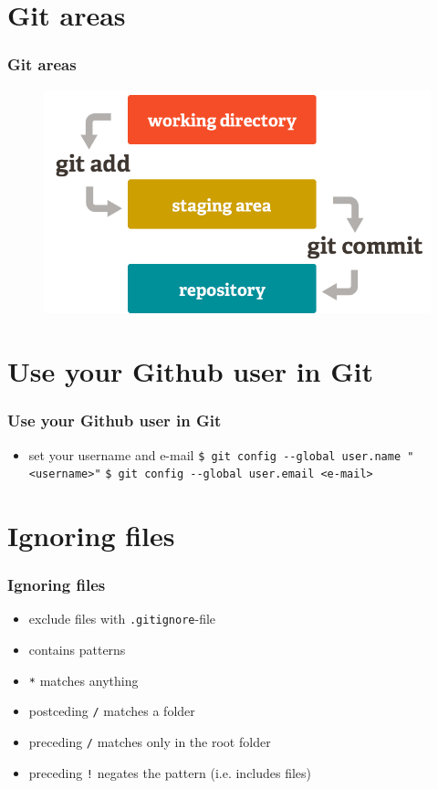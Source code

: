 \documentclass{beamer}
\begin{document}
	\section{Git areas}
	\begin{frame}
		\frametitle{Git areas}
		\begin{figure}[h]
			\centering
			\includegraphics[width=.9\linewidth]{git-areas.png}
			\label{fig1}
		\end{figure}
	\end{frame}

	\section{Use your Github user in Git}
	\begin{frame}
		\frametitle{Use your Github user in Git}\pause
		\begin{itemize}
			\item set your username and e-mail \newline
			\lstinline|$ git config --global user.name "<username>"|\newline
			\lstinline|$ git config --global user.email <e-mail>|\newline
		\end{itemize}
	\end{frame}

	\section{Ignoring files}
	\begin{frame}
		\frametitle{Ignoring files}\pause
		\begin{itemize}
			\item exclude files with \lstinline|.gitignore|-file \pause
			\item contains patterns \pause
			\item \lstinline|*| matches anything \pause
			\item postceding \lstinline|/| matches a folder \pause
			\item preceding \lstinline|/| matches only in the root folder \pause
			\item preceding \lstinline|!| negates the pattern (i.e. includes files)
		\end{itemize}
	\end{frame}
\end{document}
